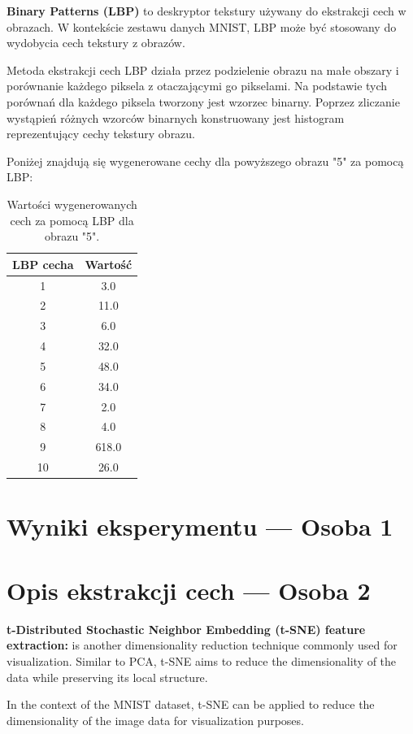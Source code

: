 \documentclass[12pt]{article}
\begin{document}
    \textbf{Binary Patterns (LBP)} to deskryptor tekstury używany do ekstrakcji cech w obrazach. W kontekście zestawu danych MNIST, LBP może być stosowany do wydobycia cech tekstury z obrazów.

    Metoda ekstrakcji cech LBP działa przez podzielenie obrazu na małe obszary i porównanie każdego piksela z otaczającymi go pikselami. Na podstawie tych porównań dla każdego piksela tworzony jest wzorzec binarny. Poprzez zliczanie wystąpień różnych wzorców binarnych konstruowany jest histogram reprezentujący cechy tekstury obrazu.

    Poniżej znajdują się wygenerowane cechy dla powyższego obrazu "5" za pomocą LBP:
    \begin{table}[h]
\centering
\begin{tabular}{|c|c|}
\hline
\textbf{LBP cecha} & \textbf{Wartość} \\
\hline
1 & 3.0 \\
2 & 11.0 \\
3 & 6.0 \\
4 & 32.0 \\
5 & 48.0 \\
6 & 34.0 \\
7 & 2.0 \\
8 & 4.0 \\
9 & 618.0 \\
10 & 26.0 \\
\hline
\end{tabular}
\caption{Wartości wygenerowanych cech za pomocą LBP dla obrazu "5".}
\end{table}

    \pagebreak

    \section{Wyniki eksperymentu --- Osoba 1}
    \pagebreak

    \section{Opis ekstrakcji cech --- Osoba 2}
    \textbf{t-Distributed Stochastic Neighbor Embedding (t-SNE) feature extraction:}
    is another dimensionality reduction technique commonly used for visualization. Similar to PCA, t-SNE aims to reduce the dimensionality of the data while preserving its local structure.

    In the context of the MNIST dataset, t-SNE can be applied to reduce the dimensionality of the image data for visualization purposes.
\end{document}

